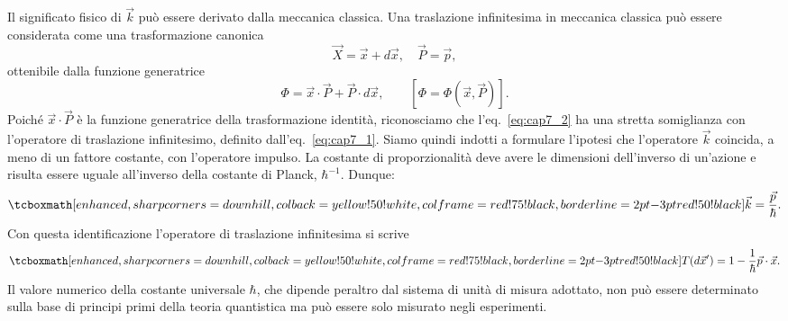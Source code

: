 \documentclass[a4paper,12pt,oneside]{book}
\begin{document}
Il significato fisico di $\vec{k}$ può essere derivato dalla meccanica classica. Una traslazione infinitesima in meccanica classica può essere considerata come una trasformazione canonica
	\begin{equation}
		\vec{X}= \vec{x}+ d\vec{x}, \quad \vec{P}= \vec{p} ,
	\end{equation}
ottenibile dalla funzione generatrice
	\begin{equation}
		\label{eq:cap7_2}
		\Phi = \vec{x}\cdot \vec{P}+\vec{P}\cdot d\vec{x} ,\qquad\left[\Phi=\Phi ( \vec{x}, \vec{P} ) \right].
	\end{equation}
Poiché $\vec{x} \cdot \vec{P}$ è la funzione generatrice della trasformazione identità, riconosciamo che l'eq.~\eqref{eq:cap7_2} ha una stretta somiglianza con l'operatore di traslazione infinitesimo, definito dall'eq.~\eqref{eq:cap7_1}. Siamo quindi indotti a  formulare l'ipotesi che l'operatore $\vec{k}$ coincida, a meno di un fattore costante, con l'operatore impulso. La costante di proporzionalità deve avere le dimensioni dell'inverso di un'azione e risulta essere uguale all'inverso della costante di Planck, $\hbar ^{-1}$. Dunque:
	\begin{equation}
		\tcboxmath[enhanced,sharp corners=downhill ,colback=yellow!50!white,colframe=red!75!black, borderline={2pt}{-3pt}{red!50!black}]{	
			\vec{k}=\frac{\vec{p}}{\hbar}.
			}
	\end{equation}
Con questa identificazione l'operatore di traslazione infinitesima si scrive
	\begin{equation}
		\label{eq:cap7_3}
		\tcboxmath[enhanced,sharp corners=downhill ,colback=yellow!50!white,colframe=red!75!black, borderline={2pt}{-3pt}{red!50!black}]{	
			T(d\vec{x}') = 1-\frac{1}{\hbar}\vec{p}\cdot\vec{x}.
			}
	\end{equation}
Il valore numerico della costante universale $\hbar$, che dipende peraltro dal sistema di unità di misura adottato, non può essere determinato sulla base di principi primi della teoria quantistica ma può essere solo misurato negli esperimenti. \\
\end{document}

